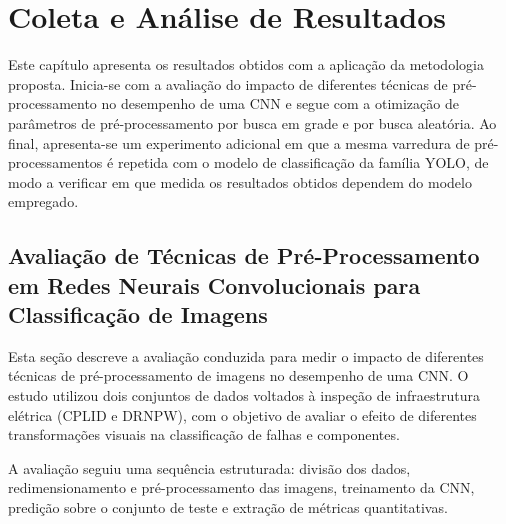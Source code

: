 \chapter{Coleta e Análise de Resultados}
\label{chap:coleta_e_analise}

Este capítulo apresenta os resultados obtidos com a aplicação da metodologia proposta. Inicia-se com a avaliação do impacto de diferentes técnicas de pré-processamento no desempenho de uma CNN e segue com a otimização de parâmetros de pré-processamento por busca em grade e por busca aleatória. Ao final, apresenta-se um experimento adicional em que a mesma varredura de pré-processamentos é repetida com o modelo de classificação da família YOLO, de modo a verificar em que medida os resultados obtidos dependem do modelo empregado.

\section{Avaliação de Técnicas de Pré-Processamento em Redes Neurais Convolucionais para Classificação de Imagens}
\label{sec:avaliacao_cnn}

Esta seção descreve a avaliação conduzida para medir o impacto de diferentes técnicas de pré-processamento de imagens no desempenho de uma CNN. O estudo utilizou dois conjuntos de dados voltados à inspeção de infraestrutura elétrica (CPLID e DRNPW), com o objetivo de avaliar o efeito de diferentes transformações visuais na classificação de falhas e componentes.

A avaliação seguiu uma sequência estruturada: divisão dos dados, redimensionamento e pré-processamento das imagens, treinamento da CNN, predição sobre o conjunto de teste e extração de métricas quantitativas.

